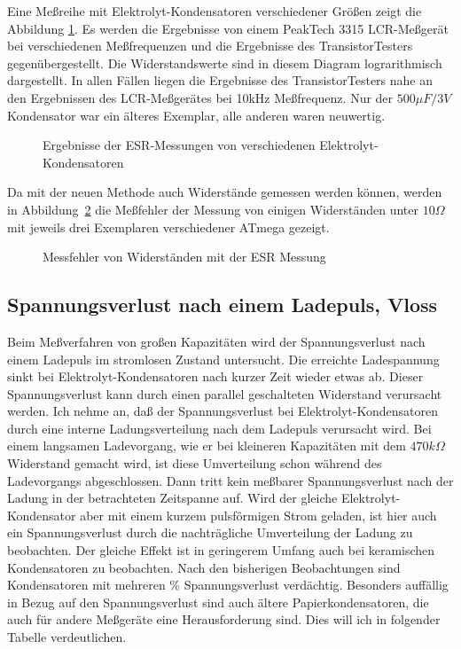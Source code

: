 Eine Meßreihe mit Elektrolyt-Kondensatoren verschiedener Größen zeigt die Abbildung \ref{fig:ElcoESR}.
Es werden die Ergebnisse von einem PeakTech 3315 LCR-Meßgerät bei verschiedenen Meßfrequenzen und die
Ergebnisse des TransistorTesters gegenübergestellt. Die Widerstandswerte sind in diesem Diagram lograrithmisch dargestellt.
In allen Fällen liegen die Ergebnisse des TransistorTesters
nahe an den Ergebnissen des LCR-Meßgerätes bei 10kHz Meßfrequenz. 
Nur der \(500 \mu F/3V\) Kondensator war ein älteres Exemplar, alle anderen waren neuwertig.

\begin{figure}[H]
\centering

\caption{Ergebnisse der ESR-Messungen von verschiedenen Elektrolyt-Kondensatoren}
\label{fig:ElcoESR}
\end{figure}

Da mit der neuen Methode auch Widerstände gemessen werden können, werden in Abbildung~\ref{fig:res_esr} die
Meßfehler der Messung von einigen Widerständen unter \(10 \Omega\) mit jeweils drei Exemplaren verschiedener
ATmega gezeigt.  

\begin{figure}[H]
\centering

\caption{Messfehler von Widerständen mit der ESR Messung}
\label{fig:res_esr}
\end{figure}


\subsection{Spannungsverlust nach einem Ladepuls, Vloss}
Beim Meßverfahren von großen Kapazitäten wird der Spannungsverlust nach einem Ladepuls im stromlosen Zustand untersucht.
Die erreichte Ladespannung sinkt bei Elektrolyt-Kondensatoren nach kurzer Zeit wieder etwas ab.
Dieser Spannungsverlust kann durch einen parallel geschalteten Widerstand verursacht werden.
Ich nehme an, daß der Spannungsverlust bei Elektrolyt-Kondensatoren durch eine interne Ladungsverteilung nach
dem Ladepuls verursacht wird. Bei einem langsamen Ladevorgang, wie er bei kleineren Kapazitäten mit dem \(470 k\Omega\) Widerstand
gemacht wird, ist diese Umverteilung schon während des Ladevorgangs abgeschlossen. Dann tritt kein meßbarer Spannungsverlust nach
der Ladung in der betrachteten Zeitspanne auf. Wird der gleiche Elektrolyt-Kondensator aber mit einem
kurzem pulsförmigen Strom geladen, ist hier auch ein Spannungsverlust durch die nachträgliche Umverteilung
der Ladung zu beobachten. Der gleiche Effekt ist in geringerem Umfang auch bei keramischen Kondensatoren zu beobachten. 
Nach den bisherigen Beobachtungen sind Kondensatoren mit mehreren \% Spannungsverlust verdächtig.
Besonders auffällig in Bezug auf den Spannungsverlust sind auch ältere Papierkondensatoren, die auch für andere Meßgeräte
eine Herausforderung sind. Dies will ich in folgender Tabelle verdeutlichen.
\vspace{0.5 cm}

